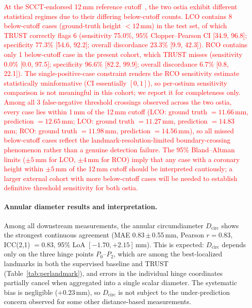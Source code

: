 \documentclass[conference]{IEEEtran}
\begin{document}
\textcolor{red}{At the SCCT-endorsed 12\,mm reference cutoff~\cite{Blanke2019_scct_tavi_ct}, the two ostia exhibit different statistical regimes due to their differing below-cutoff counts. LCO contains 8 below-cutoff cases (ground-truth height $<12$\,mm) in the test set, of which TRUST correctly flags 6 (sensitivity 75.0\%, 95\% Clopper--Pearson CI [34.9, 96.8]; specificity 77.3\% [54.6, 92.2]; overall discordance 23.3\% [9.9, 42.3]). RCO contains only 1 below-cutoff case in the present cohort, which TRUST misses (sensitivity 0.0\% [0.0, 97.5]; specificity 96.6\% [82.2, 99.9]; overall discordance 6.7\% [0.8, 22.1]). The single-positive-case constraint renders the RCO sensitivity estimate statistically uninformative (CI essentially $[0, 1]$), so per-ostium sensitivity comparison is not meaningful in this cohort; we report it for completeness only. Among all 3 false-negative threshold crossings observed across the two ostia, every case lies within 1\,mm of the 12\,mm cutoff (LCO: ground truth $=11.66$\,mm, prediction $=12.65$\,mm; LCO: ground truth $=11.27$\,mm, prediction $=14.83$\,mm; RCO: ground truth $=11.98$\,mm, prediction $=14.56$\,mm), so all missed below-cutoff cases reflect the landmark-resolution-limited boundary-crossing phenomenon rather than a genuine detection failure. The 95\% Bland--Altman limits (${\pm}5$\,mm for LCO, $\pm 4$\,mm for RCO) imply that any case with a coronary height within ${\pm}5$\,mm of the 12\,mm cutoff should be interpreted cautiously; a larger external cohort with more below-cutoff cases will be needed to establish definitive threshold sensitivity for both ostia.}

\paragraph{Annular diameter results and interpretation.}
Among all downstream measurements, the annular circumdiameter $D_{\text{circ}}$ shows the strongest continuous agreement (MAE 0.83\,$\pm$\,0.55\,mm, Pearson $r = 0.83$, ICC(2,1) $= 0.83$, 95\% LoA $[-1.70, +2.15]$\,mm). This is expected: $D_{\text{circ}}$ depends only on the three hinge points $P_0$--$P_2$, which are among the best-localized landmarks in both the supervised baseline and TRUST (Table~\ref{tab:perlandmark}), and errors in the individual hinge coordinates partially cancel when aggregated into a single scalar diameter. The systematic bias is negligible ($+0.23$\,mm), so $D_{\text{circ}}$ is not subject to the under-prediction concern observed for some other distance-based measurements.
\end{document}
